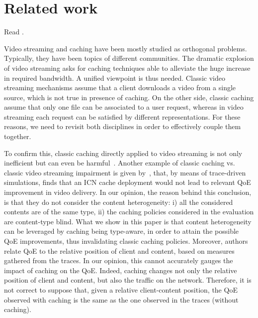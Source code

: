 \documentclass[10pt, journal,letterpaper]{IEEEtran}
\begin{document}


\section{Related work}
Read \cite{Mansy}.

Video streaming and caching have been mostly studied as orthogonal problems. Typically, they have been topics of different communities. The dramatic explosion of video streaming asks for caching techniques able to alleviate the huge increase in required bandwidth. A unified viewpoint is thus needed. Classic video streaming mechanisms assume that a client downloads a video from a single source, which is not true in presence of caching. On the other side, classic caching assume that only one file can be associated to a user request, whereas in video streaming each request can be satisfied by different representations. For these reasons, we need to revisit both disciplines in order to effectively couple them together.

To confirm this, classic caching directly applied to video streaming is not only inefficient but can even be harmful~\cite{Lee2014}.
Another example of classic caching vs. classic video streaming impairment is given by~\cite{Sun2014}, that, by means of trace-driven simulations, finds that an ICN cache deployment would not lead to relevant QoE improvement in video delivery. In our opinion, the reason behind this conclusion, is that they do not consider the content heterogeneity: i) all the considered contents are of the same type, ii) the caching policies considered in the evaluation are content-type blind. What we show in this paper is that content heterogeneity can be leveraged by caching being type-aware, in order to attain the possible QoE improvements, thus invalidating classic caching policies. Moreover, authors relate QoE to the relative position of client and content, based on measures gathered from the traces. In our opinion, this cannot accurately gauges the impact of caching on the QoE. Indeed, caching changes not only the relative position of client and content, but also the traffic on the network. Therefore, it is not correct to suppose that, given a relative client-content position, the QoE observed with caching is the same as the one observed in the traces (without caching).
\end{document}
